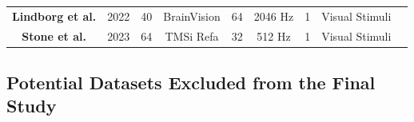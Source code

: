 \begin{table}[ht]
{\begin{tabular}{c|cccccccc}
\rule{0pt}{25pt}\textbf{Lindborg et al. \cite{lindborg2023semantic}} & 2022 & 40 & BrainVision & 64 & 2046 Hz & 1 & Visual Stimuli\\

\rowcolor{Gray}
\rule{0pt}{25pt}\textbf{Stone et al. \cite{stone2023understanding}} & 2023 & 64 & TMSi Refa & 32 & 512 Hz & 1 & Visual Stimuli\\


\hline
\end{tabular}
}
\end{table}


\subsection{Potential Datasets Excluded from the Final Study}
\label{sec:Solution Approach:Survey Open Datasets: Potential Datasets Excluded from the Final Study}
